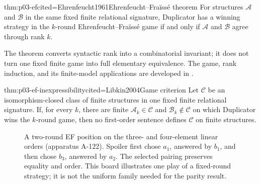 \begin{hbtheorem}{thm:p03-ef}{cited=Ehrenfeucht1961}{Ehrenfeucht--Fra\"iss\'e theorem}
For structures \(\mathcal A\) and \(\mathcal B\) in the same fixed finite
relational signature, Duplicator has a winning strategy in the \(k\)-round
Ehrenfeucht--Fra\"iss\'e game if and only if \(\mathcal A\) and
\(\mathcal B\) agree through rank \(k\).
\end{hbtheorem}

The theorem converts syntactic rank into a combinatorial invariant; it does
not turn one fixed finite game into full elementary equivalence.  The game,
rank induction, and its finite-model applications are developed in
\cite{Ehrenfeucht1961,Libkin2004}.

\begin{hbcorollary}{thm:p03-ef-inexpressibility}{cited=Libkin2004}{Game criterion}
Let \(\mathcal C\) be an isomorphism-closed class of finite structures in one
fixed finite relational signature.  If, for every \(k\), there are finite
\(\mathcal A_k\in\mathcal C\) and \(\mathcal B_k\notin\mathcal C\) on which
Duplicator wins the \(k\)-round game, then no first-order sentence defines
\(\mathcal C\) on finite structures.
\end{hbcorollary}

\begin{figure}[htbp]
\centering
{}
\caption{A two-round EF position on the three- and four-element linear orders
(apparatus A-122).  Spoiler first chose \(a_1\), answered by \(b_1\), and
then chose \(b_3\), answered by \(a_2\).  The selected pairing preserves
equality and order.  This board illustrates one play of a fixed-round strategy;
it is not the uniform family needed for the parity result.}
\label{fig:p03-ef-board}
\end{figure}

